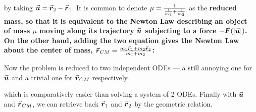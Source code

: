 \documentclass[class=article, crop=false, 12pt]{standalone}
\begin{document}
by taking $\va*{u} = \va*{r}_2 - \va*{r}_1$. It is common to denote $\mu = \frac{1}{\frac{1}{m_1}+\frac{1}{m_2}}$ as the \bf{reduced mass}, 
so that it is equivalent to the Newton  Law describing an object of mass $\mu$ moving along its trajectory $\va*{u}$ subjecting to a force $-\va*{F}(\abs{\va*{u}})$. 
On the other hand, adding the two equation gives the Newton  Law about the center of mass, $\va*{r}_{CM} = \frac{m_1\va*{r}_1+m_2\va*{r}_2}{m_1+m_2}$:


Now the problem is reduced to two independent ODEs --- a still annoying one for $\va*{u}$ and a trivial one for $\va*{r}_{CM}$ respectively.

which is comparatively easier than solving a system of 2 ODEs. 
Finally with $\va*{u}$ and $\va*{r}_{CM}$, we can retrieve back $\va*{r}_1$ and $\va*{r}_2$ by the geometric relation.



\theend
\end{document}
